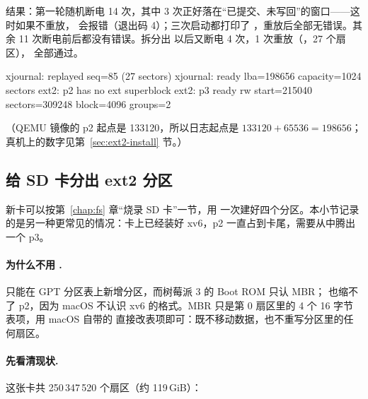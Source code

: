 结果：第一轮随机断电 14 次，其中 3 次正好落在“已提交、未写回”的窗口——这时如果不重放， 会报错（退出码 4）；三次启动都打印了 ，重放后全部无错误。其余 11 次断电前后都没有错误。拆分出  以后又断电 4 次，1 次重放（，27 个扇区）， 全部通过。

\begin{txtcode}
xjournal: replayed seq=85 (27 sectors)
xjournal: ready lba=198656 capacity=1024 sectors
ext2: p2 has no ext superblock
ext2: p3 ready rw start=215040 sectors=309248 block=4096 groups=2
\end{txtcode}

（QEMU 镜像的 p2 起点是 133120，所以日志起点是 $133120 + 65536 = 198656$；真机上的数字见第~\ref{sec:ext2-install} 节。）

\subsection{给 SD 卡分出 ext2 分区}
\label{sec:ext2-part}

新卡可以按第~\ref{chap:fs} 章“烧录 SD 卡”一节，用  一次建好四个分区。本小节记录的是另一种更常见的情况：卡上已经装好 xv6，p2 一直占到卡尾，需要从中腾出一个 p3。

\paragraph{为什么不用 .}  只能在 GPT 分区表上新增分区，而树莓派 3 的 Boot ROM 只认 MBR； 也缩不了 p2，因为 macOS 不认识 xv6 的格式。MBR 只是第 0 扇区里的 4 个 16 字节表项，用 macOS 自带的  直接改表项即可：既不移动数据，也不重写分区里的任何扇区。

\paragraph{先看清现状.} 这张卡共 250\,347\,520 个扇区（约 119\,GiB）：


